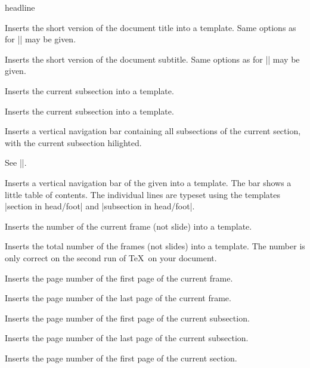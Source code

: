 \begin{element}{headline}
\begin{itemize}
    \iteminsert{\insertshorttitle}
    Inserts the short version of the document title into a template. Same
    options as for |\insertshortauthor| may be given. 

    \iteminsert{\insertshortsubtitle}
    Inserts the short version of the document subtitle. Same
    options as for |\insertshortauthor| may be given. 

    \iteminsert{\insertsubsection}
    Inserts the current subsection into a template.

    \iteminsert{\insertsubsubsection}
    Inserts the current subsection into a template.

    \iteminsert{\insertsubsectionnavigation}
    Inserts a vertical navigation bar containing all subsections of the
    current section, with the current subsection hilighted.

    \iteminsert{\insertsubsectionnavigationhorizontal}
    
    See |\insertsectionnavigationhorizontal|.

    \iteminsert{\insertverticalnavigation}
    Inserts a vertical navigation bar of the given  into a
    template. The bar shows a little table of contents. The individual
    lines are typeset using the templates
    |section in head/foot| and |subsection in head/foot|.

    \iteminsert{\insertframenumber}
    Inserts the number of the current frame (not slide) into a template.

    \iteminsert{\inserttotalframenumber}
    Inserts the total number of the frames (not slides) into a
    template. The number is only correct on the second run of \TeX\ on
    your document.

    \iteminsert{\insertframestartpage}
    Inserts the page number of the first page of the current frame.

    \iteminsert{\insertframeendpage}
    Inserts the page number of the last page of the current frame.

    \iteminsert{\insertsubsectionstartpage}
    Inserts the page number of the first page of the current subsection.

    \iteminsert{\insertsubsectionendpage}
    Inserts the page number of the last page of the current subsection.

    \iteminsert{\insertsectionstartpage}
    Inserts the page number of the first page of the current section.


\end{itemize}
\end{element}
